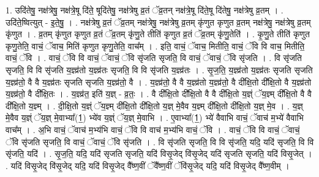 \documentclass[17pt]{extarticle}
\begin{document}
1. उदि॑तेषु॒ नक्ष॑त्रेषु॒ नक्ष॑त्रे॒षू दि॑ते॒ षूदि॑तेषु॒ नक्ष॑त्रेषु व्र॒तं ॅव्र॒तन् नक्ष॑त्रे॒षू दि॑ते॒षू दि॑तेषु॒ नक्ष॑त्रेषु व्र॒तम् । . उदि॑ते॒ष्वित्युत् - इ॒ते॒षु॒ । . नक्ष॑त्रेषु व्र॒तं ॅव्र॒तम् नक्ष॑त्रेषु॒ नक्ष॑त्रेषु व्र॒तम् कृ॑णुत कृणुत व्र॒तम् नक्ष॑त्रेषु॒ नक्ष॑त्रेषु व्र॒तम् कृ॑णुत । . व्र॒तम् कृ॑णुत कृणुत व्र॒तं ॅव्र॒तम् कृ॑णु॒ते तीति॑ कृणुत व्र॒तं ॅव्र॒तम् कृ॑णु॒तेति॑ । . कृ॒णु॒ते तीति॑ कृणुत कृणु॒तेति॒ वाचं॒ ॅवाच॒ मिति॑ कृणुत कृणु॒तेति॒ वाच᳚म् । . इति॒ वाचं॒ ॅवाच॒ मितीति॒ वाचं॒ ॅवि वि वाच॒ मितीति॒ वाचं॒ ॅवि । . वाचं॒ ॅवि वि वाचं॒ ॅवाचं॒ ॅवि सृ॑जति सृजति॒ वि वाचं॒ ॅवाचं॒ ॅवि सृ॑जति । . वि सृ॑जति सृजति॒ वि वि सृ॑जति य॒ज्ञ्व्र॑तो य॒ज्ञ्व्र॑तः सृजति॒ वि वि सृ॑जति य॒ज्ञ्व्र॑तः । . सृ॒ज॒ति॒ य॒ज्ञ्व्र॑तो य॒ज्ञ्व्र॑तः सृजति सृजति य॒ज्ञ्व्र॑तो॒ वै वै य॒ज्ञ्व्र॑तः सृजति सृजति य॒ज्ञ्व्र॑तो॒ वै । . य॒ज्ञ्व्र॑तो॒ वै वै य॒ज्ञ्व्र॑तो य॒ज्ञ्व्र॑तो॒ वै दी᳚क्षि॒तो दी᳚क्षि॒तो वै य॒ज्ञ्व्र॑तो य॒ज्ञ्व्र॑तो॒ वै दी᳚क्षि॒तः । . य॒ज्ञ्व्र॑त॒ इति॑ य॒ज्ञ् - व्र॒तः॒ । . वै दी᳚क्षि॒तो दी᳚क्षि॒तो वै वै दी᳚क्षि॒तो य॒ज्ञ्ं ॅय॒ज्ञ्म् दी᳚क्षि॒तो वै वै दी᳚क्षि॒तो य॒ज्ञ्म् । . दी॒क्षि॒तो य॒ज्ञ्ं ॅय॒ज्ञ्म् दी᳚क्षि॒तो दी᳚क्षि॒तो य॒ज्ञ् मे॒वैव य॒ज्ञ्म् दी᳚क्षि॒तो दी᳚क्षि॒तो य॒ज्ञ् मे॒व । . य॒ज्ञ् मे॒वैव य॒ज्ञ्ं ॅय॒ज्ञ् मे॒वाभ्या᳚(1॒) भ्ये॑व य॒ज्ञ्ं ॅय॒ज्ञ् मे॒वाभि । . ए॒वाभ्या᳚(1॒) भ्ये॑ वैवाभि वाचं॒ ॅवाच॑ म॒भ्ये॑ वैवाभि वाच᳚म् । . अ॒भि वाचं॒ ॅवाच॑ म॒भ्य॑भि वाचं॒ ॅवि वि वाच॑ म॒भ्य॑भि वाचं॒ ॅवि । . वाचं॒ ॅवि वि वाचं॒ ॅवाचं॒ ॅवि सृ॑जति सृजति॒ वि वाचं॒ ॅवाचं॒ ॅवि सृ॑जति । . वि सृ॑जति सृजति॒ वि वि सृ॑जति॒ यदि॒ यदि॑ सृजति॒ वि वि सृ॑जति॒ यदि॑ । . सृ॒ज॒ति॒ यदि॒ यदि॑ सृजति सृजति॒ यदि॑ विसृ॒जेद् वि॑सृ॒जेद् यदि॑ सृजति सृजति॒ यदि॑ विसृ॒जेत् । . यदि॑ विसृ॒जेद् वि॑सृ॒जेद् यदि॒ यदि॑ विसृ॒जेद् वै᳚ष्ण॒वीं ॅवै᳚ष्ण॒वीं ॅवि॑सृ॒जेद् यदि॒ यदि॑ विसृ॒जेद् वै᳚ष्ण॒वीम् । \newline
\end{document}
